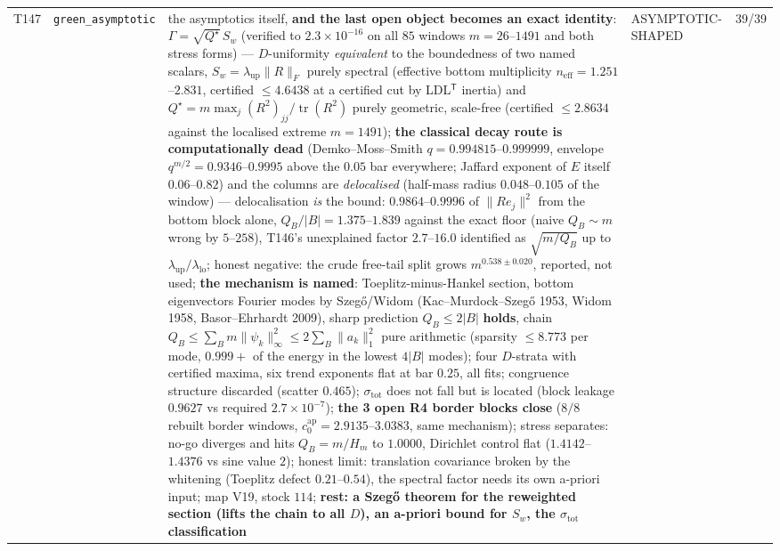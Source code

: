 \documentclass[11pt,a4paper]{article}
\begin{document}
{\begin{xltabular}{\linewidth}{@{}p{0.95cm} >{\raggedright\arraybackslash}p{3.1cm} Y >{\raggedright\scriptsize\arraybackslash}p{3.35cm} p{1.15cm}@{}}
T147 & \texttt{\scriptsize green\_\allowbreak asymptotic} & the asymptotics itself, \textbf{and the last open object becomes an exact identity}: $\Gamma=\sqrt{Q^\star}\,S_w$ (verified to $2.3\times10^{-16}$ on all $85$ windows $m=26$--$1491$ and both stress forms) --- $D$-uniformity \emph{equivalent} to the boundedness of two named scalars, $S_w=\lambda_{\mathrm{up}}\|R\|_F$ purely spectral (effective bottom multiplicity $n_{\mathrm{eff}}=1.251$--$2.831$, certified $\le4.6438$ at a certified cut by LDL$^{\mathsf T}$ inertia) and $Q^\star=m\max_j(R^2)_{jj}/\operatorname{tr}(R^2)$ purely geometric, scale-free (certified $\le2.8634$ against the localised extreme $m=1491$); \textbf{the classical decay route is computationally dead} (Demko--Moss--Smith $q=0.994815$--$0.999999$, envelope $q^{m/2}=0.9346$--$0.9995$ above the $0.05$ bar everywhere; Jaffard exponent of $E$ itself $0.06$--$0.82$) and the columns are \emph{delocalised} (half-mass radius $0.048$--$0.105$ of the window) --- delocalisation \emph{is} the bound: $0.9864$--$0.9996$ of $\|Re_j\|^2$ from the bottom block alone, $Q_B/|B|=1.375$--$1.839$ against the exact floor (naive $Q_B\sim m$ wrong by $5$--$258$), T146's unexplained factor $2.7$--$16.0$ identified as $\sqrt{m/Q_B}$ up to $\lambda_{\mathrm{up}}/\lambda_{\mathrm{lo}}$; honest negative: the crude free-tail split grows $m^{0.538\pm0.020}$, reported, not used; \textbf{the mechanism is named}: Toeplitz-minus-Hankel section, bottom eigenvectors Fourier modes by Szeg\H{o}/Widom (Kac--Murdock--Szeg\H{o} 1953, Widom 1958, Basor--Ehrhardt 2009), sharp prediction $Q_B\le2|B|$ \textbf{holds}, chain $Q_B\le\sum_Bm\|\psi_k\|_\infty^2\le2\sum_B\|a_k\|_1^2$ pure arithmetic (sparsity $\le8.773$ per mode, $0.999{+}$ of the energy in the lowest $4|B|$ modes); four $D$-strata with certified maxima, six trend exponents flat at bar $0.25$, all fits; congruence structure discarded (scatter $0.465$); $\sigma_{\mathrm{tot}}$ does not fall but is located (block leakage $0.9627$ vs required $2.7\times10^{-7}$); \textbf{the 3 open R4 border blocks close} ($8/8$ rebuilt border windows, $c_0^{\mathrm{ap}}=2.9135$--$3.0383$, same mechanism); stress separates: no-go diverges and hits $Q_B=m/H_m$ to $1.0000$, Dirichlet control flat ($1.4142$--$1.4376$ vs sine value $2$); honest limit: translation covariance broken by the whitening (Toeplitz defect $0.21$--$0.54$), the spectral factor needs its own a-priori input; map V19, stock $114$; \textbf{rest: a Szeg\H{o} theorem for the reweighted section (lifts the chain to all $D$), an a-priori bound for $S_w$, the $\sigma_{\mathrm{tot}}$ classification} & ASYMPTOTIC-SHAPED & 39/39\\

\end{xltabular}}
\end{document}
